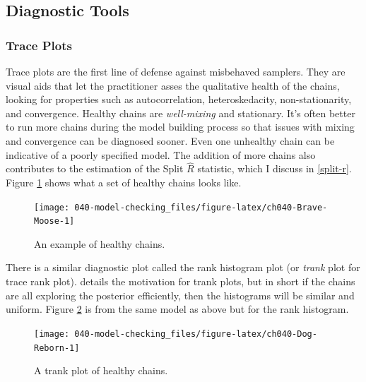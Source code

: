\documentclass[11pt, oneside, openany]{scrbook}
\begin{document}
\hypertarget{diagnostic-tools}{%
\subsection{Diagnostic Tools}\label{diagnostic-tools}}

\hypertarget{trace-plots}{%
\subsubsection{Trace Plots}\label{trace-plots}}

Trace plots are the first line of defense against misbehaved samplers. They are visual aids that let the practitioner asses the qualitative health of the chains, looking for properties such as autocorrelation, heteroskedacity, non-stationarity, and convergence. Healthy chains are \emph{well-mixing} and stationary. It's often better to run more chains during the model building process so that issues with mixing and convergence can be diagnosed sooner. Even one unhealthy chain can be indicative of a poorly specified model. The addition of more chains also contributes to the estimation of the Split \(\hat{R}\) statistic, which I discuss in \ref{split-r}. Figure \ref{fig:ch040-Brave-Moose} shows what a set of healthy chains looks like.

\begin{figure}

{\centering \texttt{[image: 040-model-checking\_files/figure-latex/ch040-Brave-Moose-1]} 

}

\caption{An example of healthy chains.}\label{fig:ch040-Brave-Moose}
\end{figure}

There is a similar diagnostic plot called the rank histogram plot (or \emph{trank} plot for trace rank plot). \citet{vehtari2020rank} details the motivation for trank plots, but in short if the chains are all exploring the posterior efficiently, then the histograms will be similar and uniform. Figure \ref{fig:ch040-Dog-Reborn} is from the same model as above but for the rank histogram.

\begin{figure}

{\centering \texttt{[image: 040-model-checking\_files/figure-latex/ch040-Dog-Reborn-1]} 

}

\caption{A trank plot of healthy chains.}\label{fig:ch040-Dog-Reborn}
\end{figure}
\end{document}
